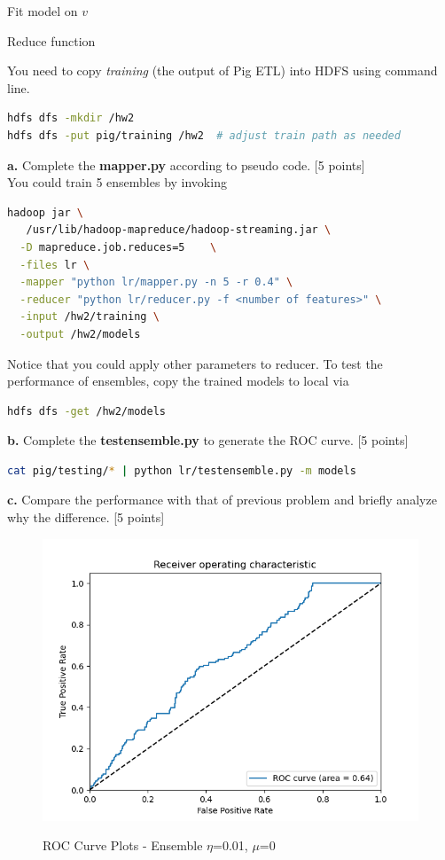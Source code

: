 \documentclass[12pt]{article}
\begin{document}
\begin{algorithm}
Fit model on $v$\;
\caption{Reduce function}\label{algo_reduce}
\end{algorithm}
You need to copy \textit{training} (the output of Pig ETL) into HDFS using command line.
\begin{lstlisting}[language=bash,frame=single]
hdfs dfs -mkdir /hw2
hdfs dfs -put pig/training /hw2  # adjust train path as needed
\end{lstlisting}
\textbf{a.} Complete the \textbf{mapper.py} according to pseudo code. [5 points]\\
You could train 5 ensembles by invoking
\begin{lstlisting}[language=bash,frame=single]
hadoop jar \
   /usr/lib/hadoop-mapreduce/hadoop-streaming.jar \
  -D mapreduce.job.reduces=5    \
  -files lr \
  -mapper "python lr/mapper.py -n 5 -r 0.4" \
  -reducer "python lr/reducer.py -f <number of features>" \
  -input /hw2/training \
  -output /hw2/models
\end{lstlisting}
Notice that you could apply other parameters to reducer. To test the performance of ensembles, copy the trained models to local via
\begin{lstlisting}[language=bash,frame=single]
hdfs dfs -get /hw2/models
\end{lstlisting}
\textbf{b.} Complete the \textbf{testensemble.py} to generate the ROC curve. [5 points]
\begin{lstlisting}[language=bash,frame=single]
cat pig/testing/* | python lr/testensemble.py -m models
\end{lstlisting}
\textbf{c.} Compare the performance with that of previous problem and briefly analyze why the difference. [5 points]

\vspace{5mm}
 \begin{figure}[h]
{\includegraphics[width = 6in]{code/lr/testensemble_roc}}
\caption{ROC Curve Plots - Ensemble $\eta$=0.01, $\mu$=0}
\end{figure}
\end{document}

